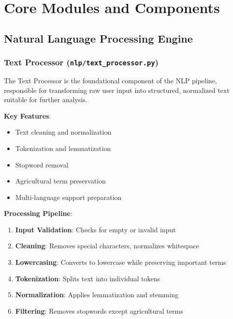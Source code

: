 \documentclass[12pt,a4paper]{article}
\begin{document}
\section{Core Modules and Components}

\subsection{Natural Language Processing Engine}

\subsubsection{Text Processor (\texttt{nlp/text\_processor.py})}

The Text Processor is the foundational component of the NLP pipeline, responsible for transforming raw user input into structured, normalized text suitable for further analysis.

\textbf{Key Features}:
\begin{itemize}[leftmargin=*]
    \item Text cleaning and normalization
    \item Tokenization and lemmatization
    \item Stopword removal
    \item Agricultural term preservation
    \item Multi-language support preparation
\end{itemize}

\textbf{Processing Pipeline}:
\begin{enumerate}[leftmargin=*]
    \item \textbf{Input Validation}: Checks for empty or invalid input
    \item \textbf{Cleaning}: Removes special characters, normalizes whitespace
    \item \textbf{Lowercasing}: Converts to lowercase while preserving important terms
    \item \textbf{Tokenization}: Splits text into individual tokens
    \item \textbf{Normalization}: Applies lemmatization and stemming
    \item \textbf{Filtering}: Removes stopwords except agricultural terms
\end{enumerate}
\end{document}
